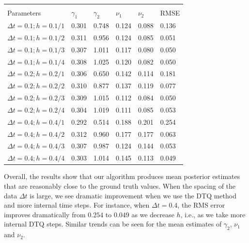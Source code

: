 \documentclass[graybox]{svmult}
\begin{document}
\vspace{-0.5cm}
\setlength{\tabcolsep}{12pt}
\begin{table}[!htbp] \centering 
\begin{tabular}{llllll}
\\[-1.8ex]\hline 
\hline \\[-1.8ex]
Parameters & $\gamma_1$ & $\gamma_2$ & $\nu_1$ & $\nu_2$ & RMSE \\ \hline
$\Delta t=0.1; h=0.1/1$  &   0.301  &   0.748 & 0.124 & 0.088 & 0.136 \\ 
$\Delta t=0.1; h=0.1/2$  &   0.311  &   0.956 & 0.124 & 0.085 & 0.051 \\ 
$\Delta t=0.1; h=0.1/3$  &   0.307  &   1.011 & 0.117 & 0.080 & 0.050 \\
$\Delta t=0.1; h=0.1/4$  &   0.308  &   1.025 & 0.120 & 0.082 & 0.050 \\ \hline
$\Delta t=0.2; h=0.2/1$  &   0.306  &   0.650 & 0.142 & 0.114 & 0.181 \\
$\Delta t=0.2; h=0.2/2$  &   0.310  &   0.877 & 0.137 & 0.119 & 0.077 \\
$\Delta t=0.2; h=0.2/3$  &   0.309  &   1.015 & 0.112 & 0.084 & 0.050 \\
$\Delta t=0.2; h=0.2/4$  &   0.304  &   1.019 & 0.111 & 0.085 & 0.053 \\ \hline
$\Delta t=0.4; h=0.4/1$  &   0.292  &   0.514 & 0.188 & 0.201 & 0.254 \\ 
$\Delta t=0.4; h=0.4/2$  &   0.312  &   0.960 & 0.177 & 0.177 & 0.063 \\
$\Delta t=0.4; h=0.4/3$  &   0.307  &   0.987 & 0.124 & 0.144 & 0.053 \\
$\Delta t=0.4; h=0.4/4$  &   0.303  &   1.014 & 0.145 & 0.113 & 0.049
\end{tabular}
\end{table} 
\vspace{-5mm}

Overall, the results show that our algorithm produces mean posterior
estimates that are reasonably close to the ground truth values. When
the spacing of the data $\Delta t$ is large, we see dramatic improvement 
when we use the DTQ method and more internal time steps.
For instance, when $\Delta t = 0.4$, the
RMS error improves dramatically from $0.254$ to
$0.049$ as we decrease $h$, i.e., as we take more internal DTQ steps.
Similar trends can be seen for the mean estimates of $\gamma_2$, $\nu_1$ and $\nu_2$.
\end{document}
